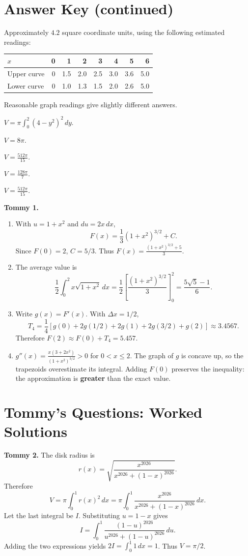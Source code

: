 \documentclass[11pt]{article}
\newcommand{\ansitem}[1]{\item[\textbf{#1.}]}
\begin{document}
\section*{Answer Key (continued)}
\begin{description}[leftmargin=2.7em,labelwidth=2em,itemsep=15pt]
\ansitem{16} Approximately $4.2$ square coordinate units, using the following estimated readings:
\begin{center}\small
\begin{tabular}{lrrrrrrr}\toprule
$x$ & 0 & 1 & 2 & 3 & 4 & 5 & 6\\\midrule
Upper curve & 0 & 1.5 & 2.0 & 2.5 & 3.0 & 3.6 & 5.0\\
Lower curve & 0 & 1.0 & 1.3 & 1.5 & 2.0 & 2.6 & 5.0\\\bottomrule
\end{tabular}\end{center}
Reasonable graph readings give slightly different answers.
\ansitem{17} $\displaystyle V=\pi\int_0^2(4-y^2)^2\,dy$.
\ansitem{18} $\displaystyle V=8\pi$.
\ansitem{19} $\displaystyle V=\frac{512\pi}{15}$.
\ansitem{20} $\displaystyle V=\frac{128\pi}{7}$.
\ansitem{21} $\displaystyle V=\frac{512\pi}{15}$.
\end{description}
\bigskip
\textbf{Tommy 1.}
\begin{enumerate}[label=\textbf{(\alph*)},leftmargin=2em,itemsep=9pt]
\item With $u=1+x^2$ and $du=2x\,dx$,
\[F(x)=\frac13(1+x^2)^{3/2}+C.\]
Since $F(0)=2$, $C=5/3$. Thus $\boxed{F(x)=\frac{(1+x^2)^{3/2}+5}{3}}$.
\item The average value is
\[\frac12\int_0^2 x\sqrt{1+x^2}\,dx
=\frac12\left[\frac{(1+x^2)^{3/2}}3\right]_0^2
=\boxed{\frac{5\sqrt5-1}{6}}.\]
\item Write $g(x)=F'(x)$. With $\Delta x=1/2$,
\[T_4=\frac14\left[g(0)+2g(1/2)+2g(1)+2g(3/2)+g(2)\right]
\approx3.4567.\]
Therefore $F(2)\approx F(0)+T_4=\boxed{5.457}$.
\item $\displaystyle g''(x)=\frac{x(3+2x^2)}{(1+x^2)^{3/2}}>0$ for $0<x\leq2$.
The graph of $g$ is concave up, so the trapezoids overestimate its integral.
Adding $F(0)$ preserves the inequality: the approximation is \textbf{greater} than the exact value.
\end{enumerate}
\clearpage

\section*{Tommy's Questions: Worked Solutions}
\textbf{Tommy 2.} The disk radius is
\[r(x)=\sqrt{\frac{x^{2026}}{x^{2026}+(1-x)^{2026}}}.\]
Therefore
\[V=\pi\int_0^1 r(x)^2\,dx
=\pi\int_0^1\frac{x^{2026}}{x^{2026}+(1-x)^{2026}}\,dx.\]
Let the last integral be $I$. Substituting $u=1-x$ gives
\[I=\int_0^1\frac{(1-u)^{2026}}{u^{2026}+(1-u)^{2026}}\,du.\]
Adding the two expressions yields $2I=\int_0^1 1\,dx=1$.
Thus $\boxed{V=\pi/2}$.
\bigskip
\end{document}

